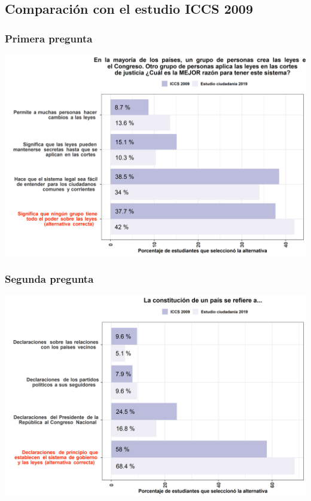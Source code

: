 \documentclass[
  14pt,
]{book}
\begin{document}
\hypertarget{comparaciuxf3n-con-el-estudio-iccs-2009}{%
\subsection{Comparación con el estudio ICCS 2009}\label{comparaciuxf3n-con-el-estudio-iccs-2009}}

\hypertarget{primera-pregunta-1}{%
\subsubsection{Primera pregunta}\label{primera-pregunta-1}}

\begin{center}\includegraphics[width=52.49in]{images/graph_p1} \end{center}

\hypertarget{segunda-pregunta-1}{%
\subsubsection{Segunda pregunta}\label{segunda-pregunta-1}}

\begin{center}\includegraphics[width=52.49in]{images/graph_p2} \end{center}
\end{document}
